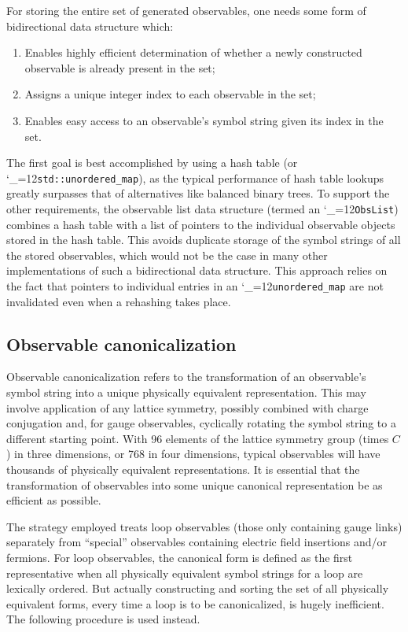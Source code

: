 \documentclass [12pt]{article}
\makeatletter
\renewcommand{\tt}{\begingroup\catcode`_=12\def\_{\string_}\tt@}
\newcommand{\tt@}[1]{\texttt{#1}\endgroup}
\makeatother
\begin{document}
For storing the entire set of generated observables,
one needs some form of bidirectional data structure which:
\begin{enumerate}\advance\itemsep -4pt
\item
    Enables highly efficient determination of whether a newly
    constructed observable is already present in the set;
\item
    Assigns a unique integer index to each observable in the set;
\item
    Enables easy access to an observable's symbol string given
    its index in the set.
\end{enumerate}
The first goal is best accomplished by using a hash table
(or \tt{std::unordered_map}), as the typical performance of
hash table lookups greatly surpasses that of alternatives like
balanced binary trees.
To support the other requirements, the observable list data structure
(termed an \tt{ObsList}) combines a hash table with a list of pointers
to the individual observable objects stored in the hash table.
This avoids duplicate storage of the symbol strings of all the
stored observables, which would not be the case in many other
implementations of such a bidirectional data structure.
This approach relies on the fact that pointers to individual entries
in an \tt{unordered_map} are not invalidated even when a rehashing
takes place.

\subsection {Observable canonicalization}

Observable canonicalization refers to the
transformation of an observable's symbol string
into a unique physically equivalent representation.
This may involve application of any lattice symmetry,
possibly combined with charge conjugation and,
for gauge observables,
cyclically rotating the symbol string to a different
starting point.
With 96 elements of the lattice symmetry group (times $C$)
in three dimensions, or 768 in four dimensions,
typical observables will have
thousands of physically equivalent representations.
It is essential that the transformation of
observables into some unique canonical representation
be as efficient as possible.

The strategy employed treats loop observables
(those only containing gauge links)
separately from ``special'' observables containing
electric field insertions and/or fermions.
For loop observables,
the canonical form is defined as the first
representative when all physically equivalent
symbol strings for a loop are lexically ordered.
But actually constructing and sorting the set of 
all physically equivalent forms, every time a
loop is to be canonicalized, is hugely inefficient.
The following procedure is used instead.
\end{document}
